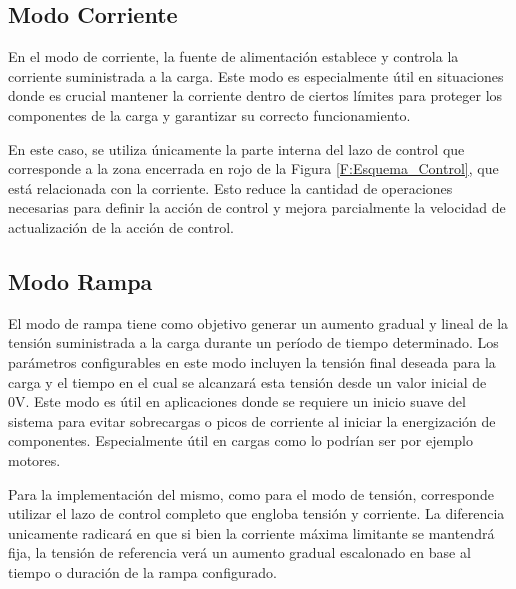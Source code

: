 \subsection{Modo Corriente}
En el modo de corriente, la fuente de alimentación establece y controla la corriente suministrada a la carga. Este modo es especialmente útil en situaciones donde es crucial mantener la corriente dentro de ciertos límites para proteger los componentes de la carga y garantizar su correcto funcionamiento. \par 
En este caso, se utiliza únicamente la parte interna del lazo de control que corresponde a la zona encerrada en rojo de la Figura \ref{F:Esquema_Control}, que está relacionada con la corriente. Esto reduce la cantidad de operaciones necesarias para definir la acción de control y mejora parcialmente la velocidad de actualización de la acción de control. \par

\subsection{Modo Rampa}
El modo de rampa tiene como objetivo generar un aumento gradual y lineal de la tensión suministrada a la carga durante un período de tiempo determinado. Los parámetros configurables en este modo incluyen la tensión final deseada para la carga y el tiempo en el cual se alcanzará esta tensión desde un valor inicial de 0V. Este modo es útil en aplicaciones donde se requiere un inicio suave del sistema para evitar sobrecargas o picos de corriente al iniciar la energización de componentes. Especialmente útil en cargas como lo podrían ser por ejemplo motores.\par 
Para la implementación del mismo, como para el modo de tensión, corresponde utilizar el lazo de control completo que engloba tensión y corriente. La diferencia unicamente radicará en que si bien la corriente máxima limitante se mantendrá fija, la tensión de referencia verá un aumento gradual escalonado en base al tiempo o duración de la rampa configurado. \par
